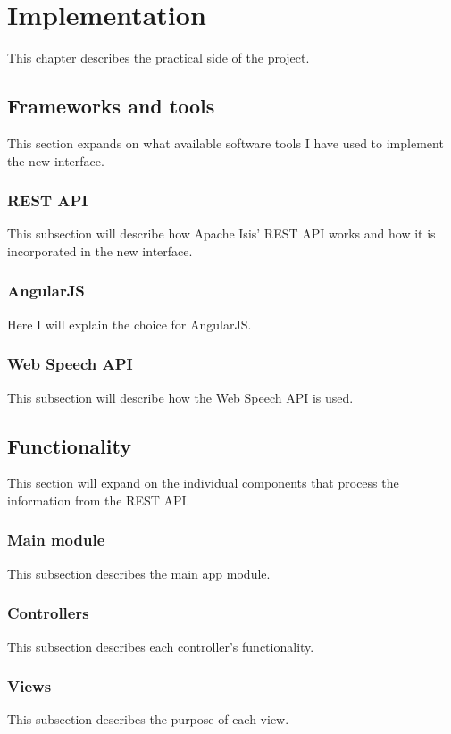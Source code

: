 \chapter{Implementation}
\label{chapter:implementation}
This chapter describes the practical side of the project. 

\section{Frameworks and tools}
\label{section:frameworkandtools}
This section expands on what available software tools I have used to implement the new interface.

\subsection{REST API}
\label{subsection:restapi}
This subsection will describe how Apache Isis' REST API works and how it is incorporated in the new interface.

\subsection{AngularJS}
\label{subsection:angularjs}
Here I will explain the choice for AngularJS.

\subsection{Web Speech API}
\label{subsection:webspeechapi}
This subsection will describe how the Web Speech API is used.

\section{Functionality}
\label{section:functionality}
This section will expand on the individual components that process the information from the REST API.

\subsection{Main module}
\label{subsection:mainmodule}
This subsection describes the main app module.

\subsection{Controllers}
\label{subsection:controllers}
This subsection describes each controller's functionality.

\subsection{Views}
\label{subsection:views}
This subsection describes the purpose of each view.